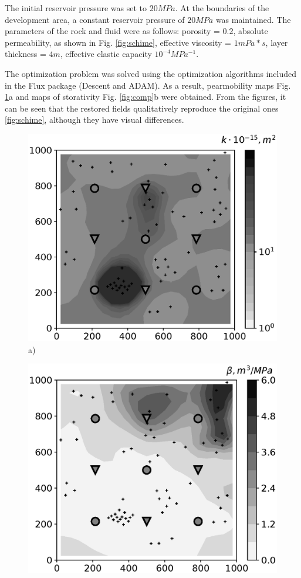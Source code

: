 \documentclass[
11pt,%
tightenlines,%
twoside,%
onecolumn,%
nofloats,%
nobibnotes,%
nofootinbib,%
superscriptaddress,%
noshowpacs,%
centertags]%
{revtex4}
\begin{document}
The initial reservoir pressure was set to $20 MPa$. At the boundaries of the development area, a constant reservoir pressure of $20 MPa$ was maintained. The parameters of the rock and fluid were as follows: porosity = $0.2$, absolute permeability, as shown in Fig. \ref{fig:schime}, effective viscosity = $1 mPa*s$, layer thickness = $4 m$, effective elastic capacity $10^{-4} MPa^{-1}$.

The optimization problem was solved using the optimization algorithms included in the Flux package (Descent and ADAM). As a result, pearmobility maps Fig. \ref{fig:mob}a and maps of storativity Fig. \ref{fig:comp}b were obtained.
From the figures, it can be seen that the restored fields qualitatively reproduce the original ones \ref{fig:schime}, although they have visual differences.

\begin{figure}
	\begin{minipage}[h]{0.48\linewidth}
		\centering
		\includegraphics[height=0.80\linewidth]{images/fig5a.eps}\\
		a)
		\label{fig:mob}
	\end{minipage} \hfill
	\begin{minipage}[h]{0.48\linewidth}
		\centering
		\includegraphics[height=0.80\linewidth]{images/fig5b.eps} \\

\end{minipage}
\end{figure}
\end{document}

